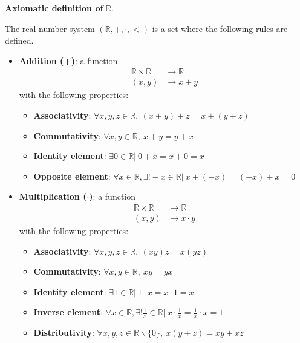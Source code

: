 \documentclass[12pt, a4paper]{book}
\begin{document}
\begin{defn}
  \textbf{Axiomatic definition of }$\mathbb{R}$.

  The real number system $(\mathbb{R}, +, \cdot, <)$ is a set where the following rules are defined.

  \begin{itemize}
    \item \textbf{Addition (+)}: a function
    \begin{align*}
      \mathbb{R}\times \mathbb{R} &\longrightarrow \mathbb{R} \\
      (x,y) &\longrightarrow x+y
    \end{align*}
    with the following properties:
    \begin{itemize}
      \item \textbf{Associativity}: $\forall x,y,z \in \mathbb{R}, \ (x+y)+z=x+(y+z)$
      \item \textbf{Commutativity}: $\forall x,y \in \mathbb{R}, \ x+y=y+x$
      \item \textbf{Identity element}: $\exists 0 \in \mathbb{R}\vert\ 0+x=x+0=x$
      \item \textbf{Opposite element}: $\forall x \in \mathbb{R}, \exists! -x\in\mathbb{R}\vert \ x+(-x)=(-x)+x=0$
    \end{itemize}

    \item \textbf{Multiplication ($\cdot$)}: a function 
    \begin{align*}
      \mathbb{R}\times \mathbb{R} &\longrightarrow \mathbb{R} \\
      (x,y) &\longrightarrow x \cdot y
    \end{align*}
    with the following properties:
    \begin{itemize}
      \item \textbf{Associativity}: $\forall x,y,z \in \mathbb{R}, \ (xy)z=x(yz)$
      \item \textbf{Commutativity}: $\forall x,y \in \mathbb{R}, \ xy=yx$
      \item \textbf{Identity element}: $\exists 1 \in \mathbb{R}\vert \ 1\cdot x=x\cdot 1=x$
      \item \textbf{Inverse element}: $\forall x \in \mathbb{R}, \exists! \frac{1}{x}\in\mathbb{R}\vert \ x\cdot \frac{1}{x} = \frac{1}{x} \cdot x = 1$
      \item \textbf{Distributivity}: $\forall x,y,z \in \mathbb{R}\backslash \{0\}, \ x(y+z)=xy + xz$
    \end{itemize}


\end{itemize}
\end{defn}
\end{document}

